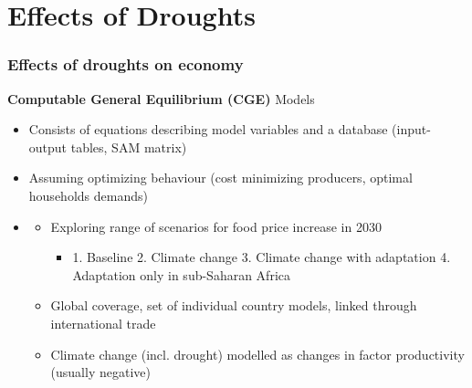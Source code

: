 \documentclass{beamer}              %
\begin{document}
\section{Effects of Droughts}



\begin{frame}

\frametitle{Effects of droughts on economy}\label{Effects} 
\begin{block}{\textbf{Computable General Equilibrium (CGE)} Models }
\begin{itemize}

\item Consists of equations describing model variables and a database (input-output tables, SAM matrix)
\item Assuming optimizing behaviour (cost minimizing producers, optimal households demands)


\item \underline{\textbf{\cite{OxfamIDS}}}
\begin{itemize}
\item Exploring range of scenarios for food price increase in 2030
\begin{itemize}
\item 1. Baseline 2. Climate change 3. Climate change with adaptation 4. Adaptation only in sub-Saharan Africa
\end{itemize}
\item Global coverage, set of individual country models, linked through international trade
\item Climate change (incl. drought) modelled as changes in factor productivity (usually negative)

\end{itemize}

\end{itemize}
\end{block}
\end{frame}
\end{document}
